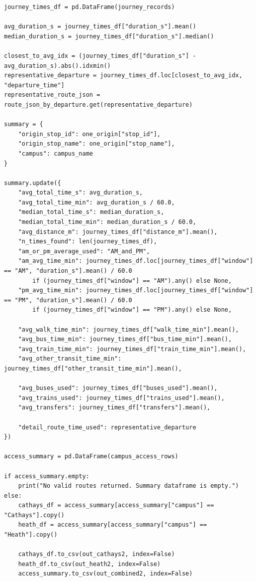 \documentclass[11pt,a4paper]{article}
\begin{document}
\begin{appendices}
\begin{lstlisting}[style=pythonappendix, caption={Construction and export of campus-specific CSV outputs}, label={lst:csv_export}]
journey_times_df = pd.DataFrame(journey_records)

avg_duration_s = journey_times_df["duration_s"].mean()
median_duration_s = journey_times_df["duration_s"].median()

closest_to_avg_idx = (journey_times_df["duration_s"] - avg_duration_s).abs().idxmin()
representative_departure = journey_times_df.loc[closest_to_avg_idx, "departure_time"]
representative_route_json = route_json_by_departure.get(representative_departure)

summary = {
    "origin_stop_id": one_origin["stop_id"],
    "origin_stop_name": one_origin["stop_name"],
    "campus": campus_name
}

summary.update({
    "avg_total_time_s": avg_duration_s,
    "avg_total_time_min": avg_duration_s / 60.0,
    "median_total_time_s": median_duration_s,
    "median_total_time_min": median_duration_s / 60.0,
    "avg_distance_m": journey_times_df["distance_m"].mean(),
    "n_times_found": len(journey_times_df),
    "am_or_pm_average_used": "AM_and_PM",
    "am_avg_time_min": journey_times_df.loc[journey_times_df["window"] == "AM", "duration_s"].mean() / 60.0
        if (journey_times_df["window"] == "AM").any() else None,
    "pm_avg_time_min": journey_times_df.loc[journey_times_df["window"] == "PM", "duration_s"].mean() / 60.0
        if (journey_times_df["window"] == "PM").any() else None,

    "avg_walk_time_min": journey_times_df["walk_time_min"].mean(),
    "avg_bus_time_min": journey_times_df["bus_time_min"].mean(),
    "avg_train_time_min": journey_times_df["train_time_min"].mean(),
    "avg_other_transit_time_min": journey_times_df["other_transit_time_min"].mean(),

    "avg_buses_used": journey_times_df["buses_used"].mean(),
    "avg_trains_used": journey_times_df["trains_used"].mean(),
    "avg_transfers": journey_times_df["transfers"].mean(),

    "detail_route_time_used": representative_departure
})

access_summary = pd.DataFrame(campus_access_rows)

if access_summary.empty:
    print("No valid routes returned. Summary dataframe is empty.")
else:
    cathays_df = access_summary[access_summary["campus"] == "Cathays"].copy()
    heath_df = access_summary[access_summary["campus"] == "Heath"].copy()

    cathays_df.to_csv(out_cathays2, index=False)
    heath_df.to_csv(out_heath2, index=False)
    access_summary.to_csv(out_combined2, index=False)
\end{lstlisting}



\end{appendices}
\end{document}
